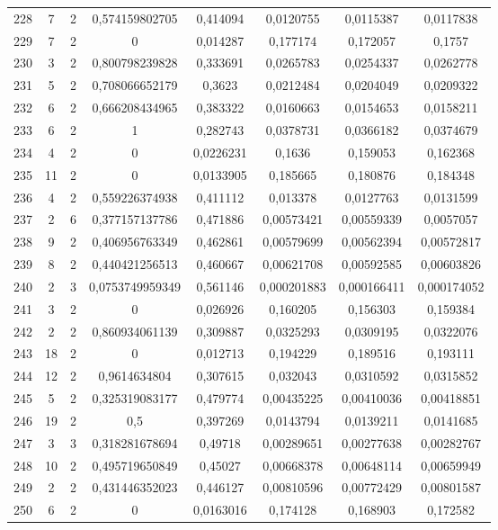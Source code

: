 \begin{longtable}{|c|c|c|c|c|c|c|c|}
228 & 7 & 2 & 0,574159802705 & 0,414094 & 0,0120755 & 0,0115387 & 0,0117838  \\
229 & 7 & 2 & 0 & 0,014287 & 0,177174 & 0,172057 & 0,1757  \\
230 & 3 & 2 & 0,800798239828 & 0,333691 & 0,0265783 & 0,0254337 & 0,0262778  \\
231 & 5 & 2 & 0,708066652179 & 0,3623 & 0,0212484 & 0,0204049 & 0,0209322  \\
232 & 6 & 2 & 0,666208434965 & 0,383322 & 0,0160663 & 0,0154653 & 0,0158211  \\
233 & 6 & 2 & 1 & 0,282743 & 0,0378731 & 0,0366182 & 0,0374679  \\
234 & 4 & 2 & 0 & 0,0226231 & 0,1636 & 0,159053 & 0,162368  \\
235 & 11 & 2 & 0 & 0,0133905 & 0,185665 & 0,180876 & 0,184348  \\
236 & 4 & 2 & 0,559226374938 & 0,411112 & 0,013378 & 0,0127763 & 0,0131599  \\
237 & 2 & 6 & 0,377157137786 & 0,471886 & 0,00573421 & 0,00559339 & 0,0057057  \\
238 & 9 & 2 & 0,406956763349 & 0,462861 & 0,00579699 & 0,00562394 & 0,00572817  \\
239 & 8 & 2 & 0,440421256513 & 0,460667 & 0,00621708 & 0,00592585 & 0,00603826  \\
240 & 2 & 3 & 0,0753749959349 & 0,561146 & 0,000201883 & 0,000166411 & 0,000174052  \\
241 & 3 & 2 & 0 & 0,026926 & 0,160205 & 0,156303 & 0,159384  \\
242 & 2 & 2 & 0,860934061139 & 0,309887 & 0,0325293 & 0,0309195 & 0,0322076  \\
243 & 18 & 2 & 0 & 0,012713 & 0,194229 & 0,189516 & 0,193111  \\
244 & 12 & 2 & 0,9614634804 & 0,307615 & 0,032043 & 0,0310592 & 0,0315852  \\
245 & 5 & 2 & 0,325319083177 & 0,479774 & 0,00435225 & 0,00410036 & 0,00418851  \\
246 & 19 & 2 & 0,5 & 0,397269 & 0,0143794 & 0,0139211 & 0,0141685  \\
247 & 3 & 3 & 0,318281678694 & 0,49718 & 0,00289651 & 0,00277638 & 0,00282767  \\
248 & 10 & 2 & 0,495719650849 & 0,45027 & 0,00668378 & 0,00648114 & 0,00659949  \\
249 & 2 & 2 & 0,431446352023 & 0,446127 & 0,00810596 & 0,00772429 & 0,00801587  \\
250 & 6 & 2 & 0 & 0,0163016 & 0,174128 & 0,168903 & 0,172582  \\

\end{longtable}
